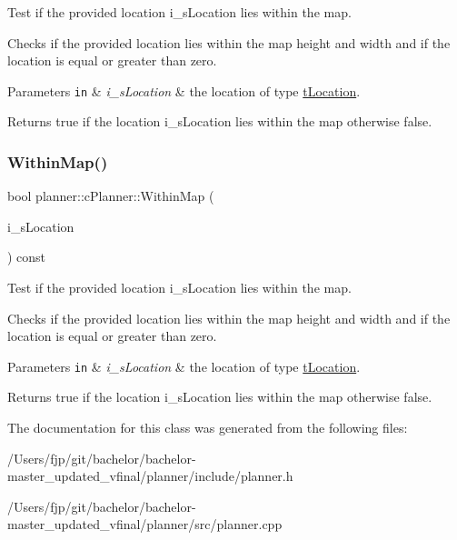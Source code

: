 Test if the provided location i\+\_\+s\+Location lies within the map. 

Checks if the provided location lies within the map height and width and if the location is equal or greater than zero. 
\begin{DoxyParams}[1]{Parameters}
\mbox{\tt in}  & {\em i\+\_\+s\+Location} & the location of type \mbox{\hyperlink{structplanner_1_1t_location}{t\+Location}}. \\
\hline
\end{DoxyParams}
\begin{DoxyReturn}{Returns}
true if the location i\+\_\+s\+Location lies within the map otherwise false. 
\end{DoxyReturn}
\mbox{\label{classplanner_1_1c_planner_ac5119e3243d9f6747f1da0ed6d356642}} 
\subsubsection{\texorpdfstring{Within\+Map()}{WithinMap()}\hspace{0.1cm}{\footnotesize\ttfamily [2/2]}}
{\footnotesize\ttfamily bool planner\+::c\+Planner\+::\+Within\+Map (\begin{DoxyParamCaption}\item[{const \mbox{\hyperlink{structplanner_1_1t_location}{t\+Location}} \&}]{i\+\_\+s\+Location }\end{DoxyParamCaption}) const}



Test if the provided location i\+\_\+s\+Location lies within the map. 

Checks if the provided location lies within the map height and width and if the location is equal or greater than zero. 
\begin{DoxyParams}[1]{Parameters}
\mbox{\tt in}  & {\em i\+\_\+s\+Location} & the location of type \mbox{\hyperlink{structplanner_1_1t_location}{t\+Location}}. \\
\hline
\end{DoxyParams}
\begin{DoxyReturn}{Returns}
true if the location i\+\_\+s\+Location lies within the map otherwise false. 
\end{DoxyReturn}


The documentation for this class was generated from the following files\+:\begin{DoxyCompactItemize}
\item 
/\+Users/fjp/git/bachelor/bachelor-\/master\+\_\+updated\+\_\+vfinal/planner/include/planner.\+h\item 
/\+Users/fjp/git/bachelor/bachelor-\/master\+\_\+updated\+\_\+vfinal/planner/src/planner.\+cpp\end{DoxyCompactItemize}
